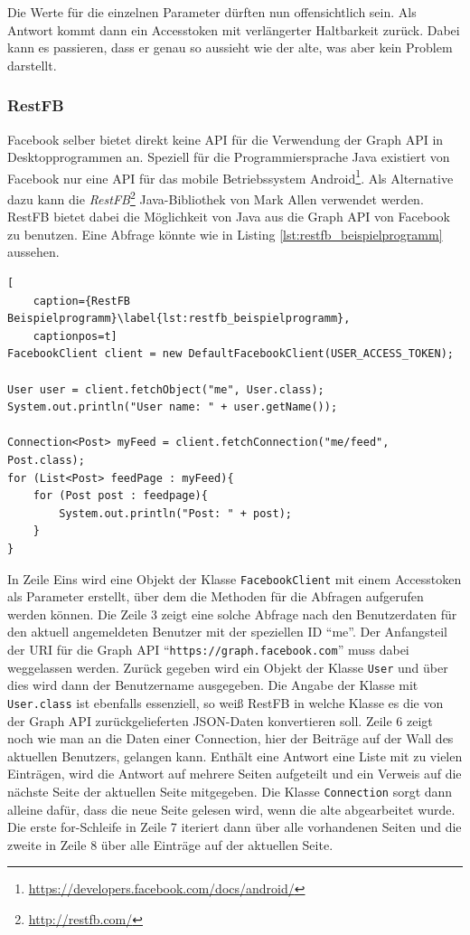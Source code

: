 Die Werte für die einzelnen Parameter dürften nun offensichtlich sein. Als Antwort kommt dann ein Accesstoken mit verlängerter Haltbarkeit zurück. Dabei kann es passieren, dass er genau so aussieht wie der alte, was aber kein Problem darstellt.



\subsubsection{RestFB} %
\label{ssub:restfb}

Facebook selber bietet direkt keine API für die Verwendung der Graph API in Desktopprogrammen an. Speziell für die Programmiersprache Java existiert von Facebook nur eine API für das mobile Betriebssystem Android\footnote{\url{https://developers.facebook.com/docs/android/}}. Als Alternative dazu kann die \emph{RestFB}\footnote{\url{ http://restfb.com/}} Java-Bibliothek von Mark Allen verwendet werden. RestFB bietet dabei die Möglichkeit von Java aus die Graph API von Facebook zu benutzen. Eine Abfrage könnte wie in Listing \ref{lst:restfb_beispielprogramm} aussehen.

\begin{lstlisting}[
    caption={RestFB Beispielprogramm}\label{lst:restfb_beispielprogramm},
    captionpos=t]
FacebookClient client = new DefaultFacebookClient(USER_ACCESS_TOKEN);

User user = client.fetchObject("me", User.class);
System.out.println("User name: " + user.getName());

Connection<Post> myFeed = client.fetchConnection("me/feed", Post.class);
for (List<Post> feedPage : myFeed){
    for (Post post : feedpage){
        System.out.println("Post: " + post);
    }
}
\end{lstlisting} 

In Zeile Eins wird eine Objekt der Klasse \texttt{FacebookClient} mit einem Accesstoken als Parameter erstellt, über dem die Methoden für die Abfragen aufgerufen werden können. Die Zeile 3 zeigt eine solche Abfrage nach den Benutzerdaten für den aktuell angemeldeten Benutzer mit der speziellen ID \enquote{me}. Der Anfangsteil der URI für die Graph API \enquote{\texttt{https://graph.facebook.com}} muss dabei weggelassen werden. Zurück gegeben wird ein Objekt der Klasse \texttt{User} und über dies wird dann der Benutzername ausgegeben. Die Angabe der Klasse mit \texttt{User.class} ist ebenfalls essenziell, so weiß RestFB in welche Klasse es die von der Graph API zurückgelieferten JSON-Daten konvertieren soll. Zeile 6 zeigt noch wie man an die Daten einer Connection, hier der Beiträge auf der Wall des aktuellen Benutzers, gelangen kann. Enthält eine Antwort eine Liste mit zu vielen Einträgen, wird die Antwort auf mehrere Seiten aufgeteilt und ein Verweis auf die nächste Seite der aktuellen Seite mitgegeben. Die Klasse \texttt{Connection} sorgt dann alleine dafür, dass die neue Seite gelesen wird, wenn die alte abgearbeitet wurde. Die erste for-Schleife in Zeile 7 iteriert dann über alle vorhandenen Seiten und die zweite in Zeile 8 über alle Einträge auf der aktuellen Seite.

